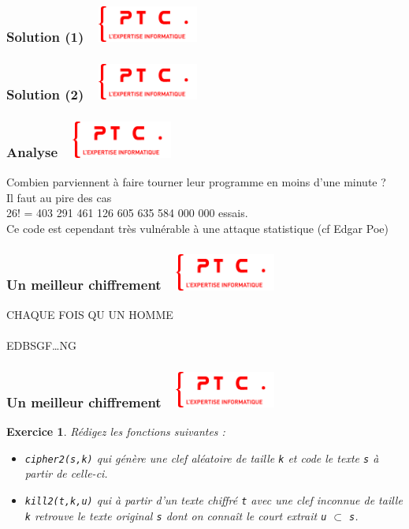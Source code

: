\documentclass[11pt]{beamer}
\newenvironment{slide}[1]{%
\begin{frame}[environment=slide]
\frametitle{#1~\hfill~\includegraphics[height=1.2cm]{./epitech.png}}
}{%
\end{frame}
}
\newtheorem{exercice}{Exercice}
\newcommand{\Python}[1]{
	{\small	}
}
\begin{document}
\begin{slide}{Solution (1)}
\Python{cipher}
\end{slide}

\begin{slide}{Solution (2)}
\Python{break}
\end{slide}

\begin{slide}{Analyse}

Combien parviennent à faire tourner leur programme en moins d'une minute ?\\
\vspace{0.2cm}
\pause
Il faut au pire des cas\\ 26! = 403 291 461 126 605 635 584 000 000 essais.\\
\vspace{0.2cm}
\pause
Ce code est cependant très vulnérable à une attaque statistique (cf Edgar Poe)

\end{slide}

\begin{slide}{Un meilleur chiffrement}

CHAQUE FOIS QU UN HOMME\\
 \color{blue}{B}     \color{red}{A}\color{red}{B}\\
\color{black}EDBSGF\qquad\qquad \ldots \qquad\quad NG

\end{slide}

\begin{slide}{Un meilleur chiffrement}

\begin{exercice}
Rédigez les fonctions suivantes :
\begin{itemize}
	\item \texttt{cipher2(s,k)} qui génère une clef aléatoire de taille \texttt{k} et code le texte \texttt{s} à partir de celle-ci.
	\pause
	\item \texttt{kill2(t,k,u)} qui à partir d'un texte chiffré \texttt{t} avec une clef inconnue de taille \texttt{k} retrouve le texte original \texttt{s} dont on connaît le court extrait \texttt{u} $\subset$ \texttt{s}.
\end{itemize}
\end{exercice}

\end{slide}
\end{document}
